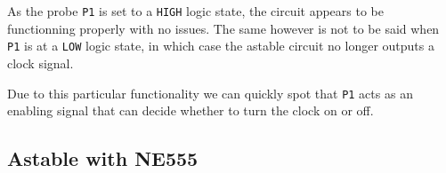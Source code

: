 \documentclass[11pt, openright]{book}
\begin{document}
As the probe \verb|P1| is set to a \verb|HIGH| logic state, the circuit appears to be functionning properly with no issues. The same however is not to be said when \verb|P1| is at a \verb|LOW| logic state, in which case the astable circuit no longer outputs a clock signal.

Due to this particular functionality we can quickly spot that \verb|P1| acts as an enabling signal that can decide whether to turn the clock on or off. 

\subsection{Astable with NE555}


\begin{figure}[ht]
    \begin{floatrow}
\end{floatrow}
\end{figure}
\end{document}
